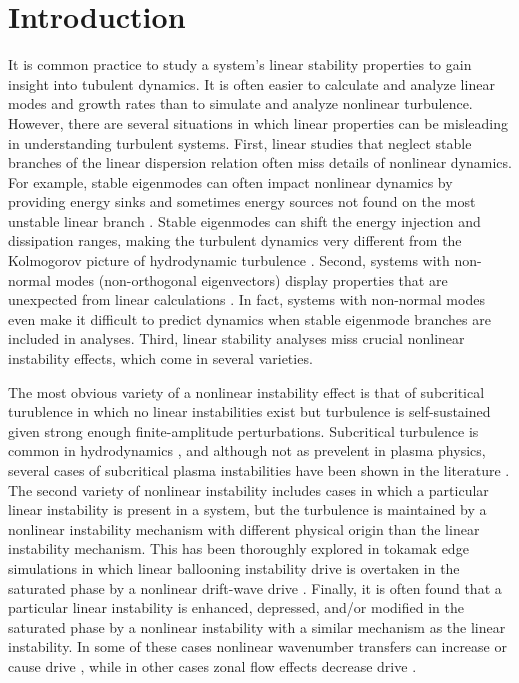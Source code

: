 \documentclass[twocolumn,showpacs,preprintnumbers,amsmath,amssymb]{revtex4}
\begin{document}
\section{Introduction}
It is common practice to study a system's linear stability properties to gain insight into tubulent dynamics. It is often easier to calculate and analyze linear modes and growth rates than
to simulate and analyze nonlinear turbulence. However, there are several situations in which linear properties can be misleading in understanding turbulent systems. First,
linear studies that neglect stable branches of the linear dispersion relation often miss details of nonlinear dynamics. For example, stable eigenmodes can often
impact nonlinear dynamics by providing energy sinks and sometimes energy sources not found on the most unstable linear branch
\cite{baver2002,terry2002,terry2006a,terry2006b,gatto2006,terry2009,hatch2009,kim2010,makwana2011,hatch2011}. Stable eigenmodes can shift
the energy injection and dissipation ranges, making the turbulent dynamics very different from the Kolmogorov picture of hydrodynamic turbulence \cite{Kolmogorov1941}.
Second, systems with non-normal modes (non-orthogonal eigenvectors) display properties that are unexpected from linear calculations \cite{kim2010,camargo1998}. 
In fact, systems with non-normal modes even make it difficult to predict dynamics
when stable eigenmode branches are included in analyses. Third, linear stability analyses miss crucial nonlinear instability effects, which come in several varieties. 

The most obvious variety of a nonlinear instability effect is that of subcritical turublence in which no linear instabilities exist but turbulence is self-sustained 
given strong enough finite-amplitude perturbations. Subcritical turbulence is common in hydrodynamics \cite{manneville2008}, and although not as prevelent in plasma physics,
several cases of subcritical plasma instabilities have been shown in the literature \cite{scott1990,scott1992,drake1995,nordman1993,waltz1985,itoh1996}.
The second variety of nonlinear instability includes cases in which a particular linear instability is present in a system, but the turbulence is maintained
by a nonlinear instability mechanism with different physical origin than the linear instability mechanism. This has been thoroughly explored in tokamak edge simulations in which
linear ballooning instability drive is overtaken in the saturated phase by a nonlinear drift-wave drive \cite{zeiler1996,zeiler1997,scott2002,scott2003,scott2005}.
Finally, it is often found that a particular linear instability is enhanced, depressed, and/or  modified in the saturated phase by a nonlinear instability with a similar mechanism 
as the linear instability. In some of these cases nonlinear wavenumber transfers can increase or cause drive \cite{biskamp1995,korsholm1999}, while in other cases zonal flow effects
decrease drive \cite{dimits2000,ernst2004}. 
\end{document}
